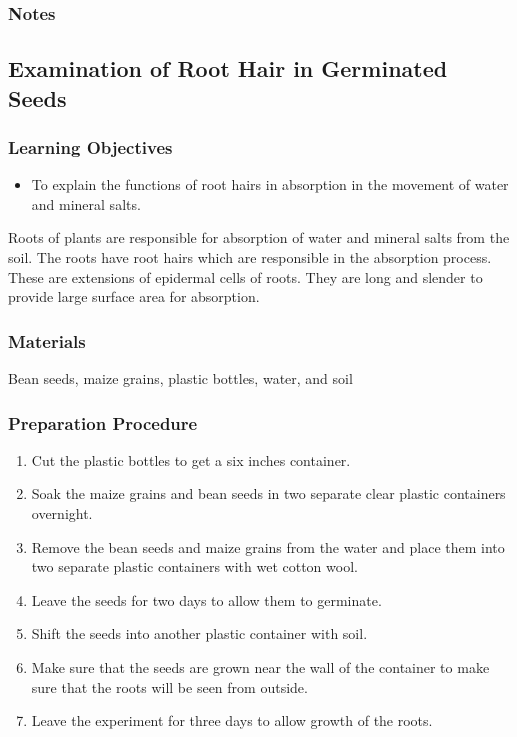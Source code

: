\subsubsection*{Notes}

\subsection{Examination of Root Hair in Germinated Seeds}

\subsubsection*{Learning Objectives}
\begin{itemize}
\item{To explain the functions of root hairs in absorption in the movement of water and mineral salts.}
\end{itemize}


Roots of plants are responsible for absorption of water and mineral salts from the soil. The roots have root hairs which are responsible in the absorption process. These are extensions of epidermal cells of roots. They are long and slender to provide large surface area for absorption.

\subsubsection*{Materials}
Bean seeds, maize grains, plastic bottles, water, and soil

\subsubsection*{Preparation Procedure}
\begin{enumerate}
\item{Cut the plastic bottles to get a six inches container.}
\item{Soak the maize grains and bean seeds in two separate clear plastic containers overnight.}
\item{Remove the bean seeds and maize grains from the water and place them into two separate plastic containers with wet cotton wool.}
\item{Leave the seeds for two days to allow them to germinate.}
\item{Shift the seeds into another plastic container with soil.}
\item{Make sure that the seeds are grown near the wall of the container to make sure that the roots will be seen from outside.}
\item{Leave the experiment for three days to allow growth of the roots.}
\end{enumerate}

